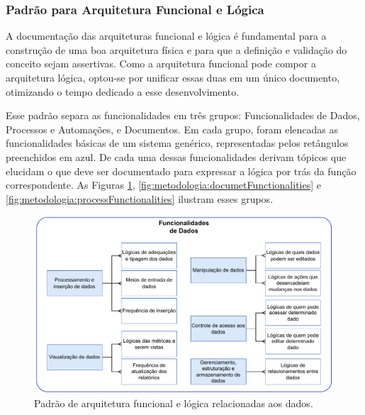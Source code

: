 	\subsubsection{Padrão para Arquitetura Funcional e Lógica}

	A documentação das arquiteturas funcional e lógica é fundamental para a construção de uma boa arquitetura física e para que a definição e validação do conceito sejam assertivas. Como a arquitetura funcional pode compor a arquitetura lógica, optou-se por unificar essas duas em um único documento, otimizando o tempo dedicado a esse desenvolvimento.

	Esse padrão separa as funcionalidades em três grupos: Funcionalidades de Dados, Processos e Automações, e Documentos. Em cada grupo, foram elencadas as funcionalidades básicas de um sistema genérico, representadas pelos retângulos preenchidos em azul. De cada uma dessas funcionalidades derivam tópicos que elucidam o que deve ser documentado para expressar a lógica por trás da função correspondente. As Figuras \ref{fig:metodologia:dataFunctionalities}, \ref{fig:metodologia:documetFunctionalities} e \ref{fig:metodologia:processFunctionalities} ilustram esses grupos.

	\begin{figure}[!htb]
		\centering
		\includegraphics[width=1\textwidth]{./figuras/dataFunctionalities.pdf}
		\caption{Padrão de arquitetura funcional e lógica relacionadas aos dados.}
		\label{fig:metodologia:dataFunctionalities}
	\end{figure}

